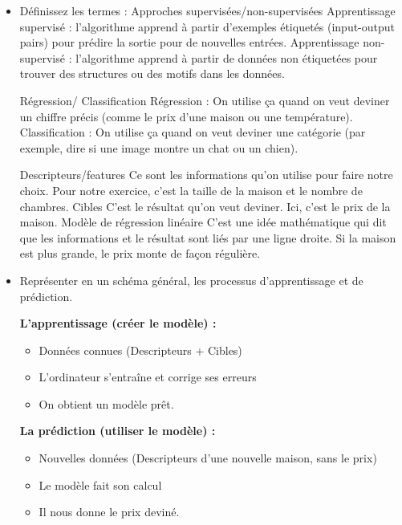 \begin{itemize}
    \item Définissez les termes :
    \subitem  Approches supervisées/non-supervisées
    \subitem Apprentissage supervisé : l’algorithme apprend à partir d’exemples étiquetés (input-output pairs) pour prédire la sortie pour de nouvelles entrées. Apprentissage non-supervisé : l’algorithme apprend à partir de données non étiquetées pour trouver des structures ou des motifs dans les données.

    \subitem Régression/ Classification
    \subitem Régression : On utilise ça quand on veut deviner un chiffre précis (comme le prix d'une maison ou une température). Classification : On utilise ça quand on veut deviner une catégorie (par exemple, dire si une image montre un chat ou un chien).

    \subitem Descripteurs/features
    \subitem Ce sont les informations qu'on utilise pour faire notre choix. Pour notre exercice, c'est la taille de la maison et le nombre de chambres.
    \subitem Cibles
    \subitem C'est le résultat qu'on veut deviner. Ici, c'est le prix de la maison.
    \subitem Modèle de régression linéaire
    \subitem C'est une idée mathématique qui dit que les informations et le résultat sont liés par une ligne droite. Si la maison est plus grande, le prix monte de façon régulière.



    \item Représenter en un schéma général, les processus d’apprentissage et de prédiction.
    
\textbf{L'apprentissage (créer le modèle) :}
\begin{itemize}
    \item[] Données connues (Descripteurs + Cibles)
    \item[$\rightarrow$] L'ordinateur s'entraîne et corrige ses erreurs
    \item[$\rightarrow$] On obtient un modèle prêt.
\end{itemize}

\vspace{0.5cm}

\textbf{La prédiction (utiliser le modèle) :}
\begin{itemize}
    \item[] Nouvelles données (Descripteurs d'une nouvelle maison, sans le prix)
    \item[$\rightarrow$] Le modèle fait son calcul
    \item[$\rightarrow$] Il nous donne le prix deviné.
\end{itemize}












\end{itemize}
